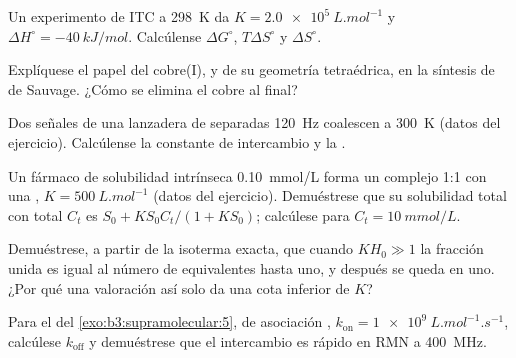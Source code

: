 \begin{exercise}[$\star\star$]\label{exo:b3:supramolecular:7}
Un experimento de ITC a \qty{298}{K} da $K = \qty{2.0e5}{L.mol^{-1}}$ y $\Delta H^\circ = \qty{-40}{kJ/mol}$. Calcúlense $\Delta G^\circ$, $T\Delta S^\circ$ y
$\Delta S^\circ$.
\end{exercise}

\begin{exercise}[$\star\star$]\label{exo:b3:supramolecular:8}
Explíquese el papel del cobre(I), y de su geometría tetraédrica, en la síntesis de  de
Sauvage. ¿Cómo se elimina el cobre al final?
\end{exercise}

\begin{exercise}[$\star\star$]\label{exo:b3:supramolecular:9}
Dos señales de una lanzadera de  separadas \qty{120}{Hz} coalescen a \qty{300}{K} (datos del
ejercicio). Calcúlense la constante de intercambio y la .
\end{exercise}

\begin{exercise}[$\star\star\star$]\label{exo:b3:supramolecular:10}
Un fármaco de solubilidad intrínseca \qty{0.10}{mmol/L} forma un complejo 1:1 con una
, $K = \qty{500}{L.mol^{-1}}$ (datos del ejercicio). Demuéstrese que su solubilidad total con
 total $C_t$ es $S_0 + KS_0C_t/(1 + KS_0)$; calcúlese para $C_t = \qty{10}{mmol/L}$.
\end{exercise}

\begin{exercise}[$\star\star\star$]\label{exo:b3:supramolecular:11}
Demuéstrese, a partir de la isoterma exacta, que cuando $KH_0 \gg 1$ la fracción unida es igual al
número de equivalentes hasta uno, y después se queda en uno. ¿Por qué una valoración así
solo da una cota inferior de $K$?
\end{exercise}

\begin{exercise}[$\star\star\star$]\label{exo:b3:supramolecular:12}
Para el  del \cref{exo:b3:supramolecular:5}, de asociación
, $k_{\mathrm{on}} = \qty{1e9}{L.mol^{-1}.s^{-1}}$, calcúlese $k_{\mathrm{off}}$ y demuéstrese que el intercambio es rápido
en RMN a \qty{400}{MHz}.
\end{exercise}

